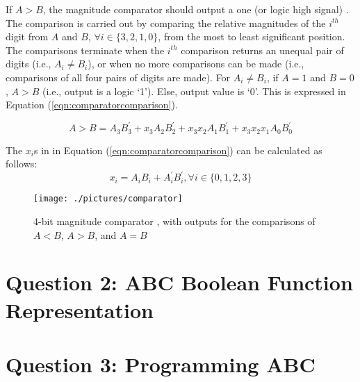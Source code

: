\documentclass[letter,12pt]{article}
\begin{document}
If $A > B$, the magnitude comparator should output a one (or logic high signal) \cite[\S4.8, pages 148--150]{Mano2013} \cite[\S5.10, pages 193--196]{Gajski1997} \cite[\S3.1.2, pages 120--121]{Katz1994}. The comparison is carried out by comparing the relative magnitudes of the $i^{th}$ digit from $A$ and $B$, $\forall i \in \{3, 2, 1, 0\}$, from the most to least significant position. The comparisons terminate when the $i^{th}$ comparison returns an unequal pair of digits (i.e., $A_{i} \neq B_{i}$), or when no more comparisons can be made (i.e., comparisons of all four pairs of digits are made). For $A_{i} \neq B_{i}$, if $A = 1$ and $ B = 0$, $A > B$ (i.e., output is a logic `1'). Else, output value is `0'. This is expressed in Equation (\ref{eqn:comparatorcomparison}).

\begin{equation}
\label{eqn:comparatorcomparison}
A > B = A_{3}B^{\prime}_{3} + x_{3}A_{2}B^{\prime}_{2} + x_{3}x_{2}A_{1}B^{\prime}_{1} + x_{3}x_{2}x_{1}A_{0}B^{\prime}_{0}
\end{equation}

The $x_{i}$s in in Equation (\ref{eqn:comparatorcomparison}) can be calculated as follows:
\begin{equation}
\label{eqn:comparatorxi}
x_{i} = A_{i}B_{i} + A^{\prime}_{i}B^{\prime}_{i}, \forall i \in \{0, 1, 2, 3\}
\end{equation}


\cite[\S3.1.2, pages 113--115]{Ashenden2008a}



\begin{figure}
\centering 
\texttt{[image: ./pictures/comparator]}
\caption{4-bit magnitude comparator \cite[\S4.8, page 150]{Mano2013}, with outputs for the comparisons of $A < B$, $A > B$, and $A = B$}
\label{fig:INSERT LABEL OF FIGURE}
\end{figure}



\section{Question 2: ABC Boolean Function Representation}
\label{sec:abcbooleanfnrep}




\section{Question 3: Programming ABC}
\label{sec:programmingabc}








{\linespread{1}

%

}
\end{document}
